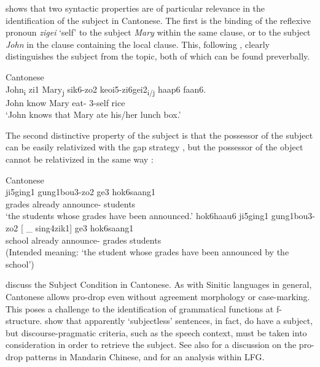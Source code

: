 \documentclass[output=paper,chinesefont,hidelinks]{langscibook}
\begin{document}
\citet{Lee2003} shows that two syntactic properties are of particular relevance in the identification of the subject in Cantonese. The first is the binding of the reflexive pronoun \textit{zigei} `self' to the subject \textit{Mary} within the same clause, or to the subject \textit{John} in the clause containing the local clause. This, following \citet{Tan1991}, clearly distinguishes the subject from the topic, both of which can be found preverbally.

\ea%
    \label{ex:Sinitic:16}Cantonese\\
    \gll John\textsubscript{i}  zi1   Mary\textsubscript{j}  sik6-zo2  keoi5-zi6gei2\textsubscript{i/j}  haap6 faan6.\\
         John   know  Mary  eat-{\PFV}  3\SG-self    {\CLF}  rice\\
    \glt `John knows that Mary ate his/her lunch box.' \citep[30]{Lee2003}
    \z

  The second distinctive property of the subject is that the possessor of the subject can be easily relativized with the gap strategy , but the possessor of the object cannot be relativized in the same way :

\ea%
    \label{ex:Sinitic:17} Cantonese\\
    \ea\label{ex:Sinitic:17a}
      ji5ging1   gung1bou3-zo2  ge3  hok6saang1\\
        {} {} grades         already   announce-{\PFV}   {\REL}  students \\
    \glt `the students whose grades have been announced.' \citep[37]{Lee2003}
    \ex \label{ex:Sinitic:17b}
    \gll *hok6haau6 ji5ging1 gung1bou3-zo2 [ \_ sing4zik1] ge3 hok6saang1\\
         school    already  announce-{\PFV}  {} {} grades   {\REL} students\\
    \glt (Intended meaning: `the student whose grades have been announced by the school') \citep[38]{Lee2003}
    \z\z

  \citet{LukeBodomoNancarrow2001} discuss the Subject Condition in Cantonese. As with Sinitic languages in general, Cantonese allows pro-drop even without agreement morphology or case-marking. This poses a challenge to the identification of grammatical functions at f-structure. \citet{LukeBodomoNancarrow2001} show that apparently `subjectless' sentences, in fact, do have a subject, but discourse-pragmatic criteria, such as the speech context, must be taken into consideration in order to retrieve the subject.  See also \citet{Liao2010} for a discussion on the pro-drop patterns in Mandarin Chinese, and for an analysis within LFG.
\end{document}
